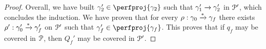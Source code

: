 \begin{proof}
	Overall, we have built $\config_2' \in \perfproj{\config_2}$ such that $\gamma_1' \xrightarrow{} \gamma_2'$ in $\mathcal{P}'$, which concludes the induction. We have proven that for every $\rho: \gamma_0 \xrightarrow{*} \gamma_f$ there exists $\rho': \gamma_0' \xrightarrow{*} \gamma_f'$ on $\mathcal{P}'$ such that $\config_f' \in \perfproj{\config_f}$. This proves that if $q_f$ may be covered in $\mathcal{P}$, then $Q_f'$ may be covered in $\mathcal{P}'$. 
	
	
	
	
		
		

\end{proof}
